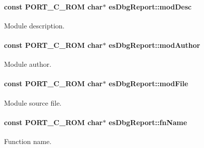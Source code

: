 \hypertarget{structesDbgReport_af5eb0b7c0c3571227eebe18a1021c97c}{
\paragraph[{mod\-Desc}]{\setlength{\rightskip}{0pt plus 5cm}const P\-O\-R\-T\-\_\-\-C\-\_\-\-R\-O\-M char$\ast$ es\-Dbg\-Report\-::mod\-Desc}}\label{structesDbgReport_af5eb0b7c0c3571227eebe18a1021c97c}


Module description. 

\hypertarget{structesDbgReport_a65c2230141505dd8ad88beed086c672e}{
\paragraph[{mod\-Author}]{\setlength{\rightskip}{0pt plus 5cm}const P\-O\-R\-T\-\_\-\-C\-\_\-\-R\-O\-M char$\ast$ es\-Dbg\-Report\-::mod\-Author}}\label{structesDbgReport_a65c2230141505dd8ad88beed086c672e}


Module author. 

\hypertarget{structesDbgReport_aee9f8437e9c8e1dd590e8cd217208643}{
\paragraph[{mod\-File}]{\setlength{\rightskip}{0pt plus 5cm}const P\-O\-R\-T\-\_\-\-C\-\_\-\-R\-O\-M char$\ast$ es\-Dbg\-Report\-::mod\-File}}\label{structesDbgReport_aee9f8437e9c8e1dd590e8cd217208643}


Module source file. 

\hypertarget{structesDbgReport_a447f326a4befb229f26182347613ade6}{
\paragraph[{fn\-Name}]{\setlength{\rightskip}{0pt plus 5cm}const P\-O\-R\-T\-\_\-\-C\-\_\-\-R\-O\-M char$\ast$ es\-Dbg\-Report\-::fn\-Name}}\label{structesDbgReport_a447f326a4befb229f26182347613ade6}


Function name. 

